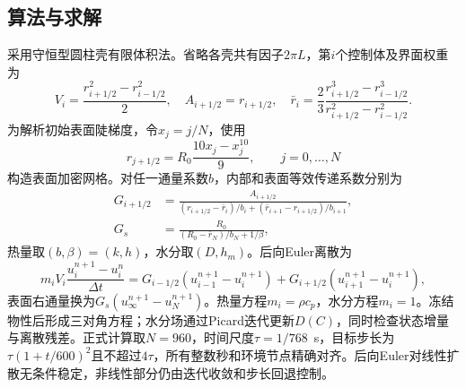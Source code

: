 \documentclass[UTF8,a4paper,zihao=-4,fontset=fandol]{ctexart}
\begin{document}
\subsection{算法与求解}
采用守恒型圆柱壳有限体积法\cite{patankar1980}。省略各壳共有因子$2\pi L$，第$i$个控制体及界面权重为
\begin{equation}
 V_i=\frac{r_{i+1/2}^2-r_{i-1/2}^2}{2},\quad
 A_{i+1/2}=r_{i+1/2},\quad
 \bar r_i=\frac23\frac{r_{i+1/2}^3-r_{i-1/2}^3}
 {r_{i+1/2}^2-r_{i-1/2}^2}.
\end{equation}
为解析初始表面陡梯度，令$x_j=j/N$，使用
\begin{equation}
 r_{j+1/2}=R_0\frac{10x_j-x_j^{10}}9,\qquad j=0,\ldots,N
\end{equation}
构造表面加密网格。对任一通量系数$b$，内部和表面等效传递系数分别为
\begin{align}
 G_{i+1/2}&=\frac{A_{i+1/2}}
 {({r_{i+1/2}-\bar r_i})/{b_i}+({\bar r_{i+1}-r_{i+1/2}})/{b_{i+1}}},\\
 G_s&=\frac{R_0}{(R_0-\bar r_N)/b_N+1/\beta},
\end{align}
热量取$(b,\beta)=(k,h)$，水分取$(D,h_m)$。后向Euler离散为
\begin{equation}
 m_iV_i\frac{u_i^{n+1}-u_i^n}{\Delta t}
 =G_{i-1/2}(u_{i-1}^{n+1}-u_i^{n+1})
 +G_{i+1/2}(u_{i+1}^{n+1}-u_i^{n+1}),
 \label{eq:be}
\end{equation}
表面右通量换为$G_s(u_\infty^{n+1}-u_N^{n+1})$。热量方程$m_i=\rho c_p$，水分方程$m_i=1$。冻结物性后形成三对角方程；水分场通过Picard迭代更新$D(C)$，同时检查状态增量与离散残差。正式计算取$N=960$，时间尺度$\tau=1/768$~s，目标步长为$\tau(1+t/600)^2$且不超过$4\tau$，所有整数秒和环境节点精确对齐。后向Euler对线性扩散无条件稳定，非线性部分仍由迭代收敛和步长回退控制。
\end{document}
